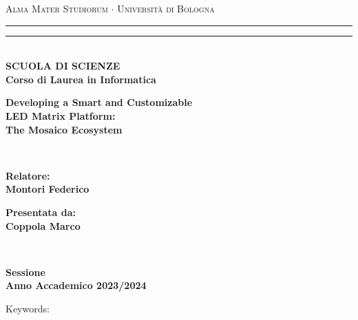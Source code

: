 \documentclass[12pt,a4paper,twoside]{book}
\newcommand{\rom}[1]{\uppercase\expandafter{\romannumeral #1\relax}}
\begin{document}
\pagestyle{empty}
\begin{titlepage}
\begin{center}
    {{\Large{\textsc{Alma Mater Studiorum $\cdot$ Università di Bologna}}}}
    \rule[0.1cm]{\textwidth}{0.1mm}
    \rule[0.5cm]{\textwidth}{0.6mm}\\
    {\small{\bf SCUOLA DI SCIENZE\\
    Corso di Laurea in Informatica}}
\end{center}

\vspace{25mm}

\begin{center}
    {\LARGE{\bf Developing a Smart and Customizable  }}\\
    \vspace{3mm}
    {\LARGE{\bf LED Matrix Platform:}}\\
    \vspace{3mm}
    {\LARGE{\bf The Mosaico Ecosystem }}\\
\end{center}

\vspace{60mm}
\par
\noindent
\begin{minipage}[t]{0.04\textwidth}
~
\end{minipage}
\begin{minipage}[t]{0.4\textwidth}
{\large{\bf Relatore:\\
Montori Federico}}
\end{minipage}
\hfill
\begin{minipage}[t]{0.4\textwidth}\raggedleft
{\large{\bf Presentata da:\\
Coppola Marco}}
\end{minipage}
\begin{minipage}[t]{0.04\textwidth}
~
\end{minipage}

\vspace{30mm}

\begin{center}
    {\large{\bf \rom{2} Sessione\\
    Anno Accademico 2023/2024 }}
\end{center}
\end{titlepage}

\restoregeometry
\newpage
\begin{center}
    Keywords:
\end{center}
\end{document}
